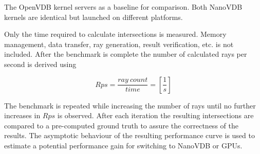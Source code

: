 The OpenVDB kernel servers as a baseline for comparison.
Both NanoVDB kernels are identical but launched on different platforms.

Only the time required to calculate intersections is measured. Memory management, data transfer, ray generation, result verification, etc. is not included.
After the benchmark is complete the number of calculated rays per second is derived using 

\begin{equation}
	Rps = \frac{ray \: count}{time} = [\frac{1}{s}]
\end{equation}

The benchmark is repeated while increasing the number of rays until no further increases in $Rps$ is observed. 
After each iteration the resulting intersections are compared to a pre-computed ground truth to assure the correctness of the results.
The asymptotic behaviour of the resulting performance curve is used to estimate a potential performance gain for switching to NanoVDB or GPUs.